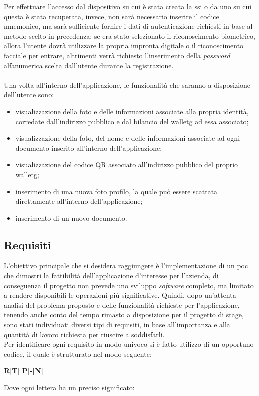 Per effettuare l'accesso dal dispositivo su cui è stata creata la \gls{ssi} o da uno su cui questa è stata recuperata, invece, non sarà necessario inserire il codice mnemonico, ma sarà sufficiente fornire i dati di autenticazione richiesti in base al metodo scelto in precedenza: se era stato selezionato il riconoscimento biometrico, allora l'utente dovrà utilizzare la propria impronta digitale o il riconoscimento facciale per entrare, altrimenti verrà richiesto l'inserimento della \textit{password} alfanumerica scelta dall'utente durante la registrazione.\\\\
Una volta all'interno dell'applicazione, le funzionalità che saranno a disposizione dell'utente sono:

\begin{itemize}
	\item visualizzazione della foto e delle informazioni associate alla propria identità, corredate dall'indirizzo pubblico e dal bilancio del \gls{walletg} ad essa associato;
	\item visualizzazione della foto, del nome e delle informazioni associate ad ogni documento inserito all'interno dell'applicazione;
	\item visualizzazione del codice QR associato all'indirizzo pubblico del proprio \gls{walletg};
	\item inserimento di una nuova foto profilo, la quale può essere scattata direttamente all'interno dell'applicazione;
	\item inserimento di un nuovo documento.
\end{itemize}

\subsection{Requisiti}

L'obiettivo principale che si desidera raggiungere è l'implementazione di un \gls{poc} che dimostri la fattibilità dell'applicazione d'interesse per l'azienda, di conseguenza il progetto non prevede uno sviluppo \textit{software} completo, ma limitato a rendere disponibili le operazioni più significative. Quindi, dopo un'attenta analisi del problema proposto e delle funzionalità richieste per l'applicazione, tenendo anche conto del tempo rimasto a disposizione per il progetto di stage, sono stati individuati diversi tipi di requisiti, in base all'importanza e alla quantità di lavoro richiesta per riuscire a soddisfarli.\\
Per identificare ogni requisito in modo univoco si è fatto utilizzo di un opportuno codice, il quale è strutturato nel modo seguente:
\begin{center}
	\textbf{R[T][P]-[N]}
\end{center}
Dove ogni lettera ha un preciso significato:

